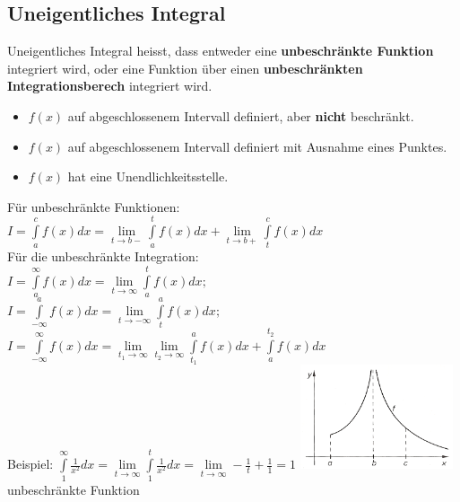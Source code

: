 	\renewcommand{\arraystretch}{1}
			



	\subsection{Uneigentliches Integral } %
	  Uneigentliches Integral heisst, dass entweder eine \textbf{unbeschränkte
	  Funktion} integriert wird, oder eine Funktion über einen
	  \textbf{unbeschränkten Integrationsberech} integriert wird.\\
	
		\begin{itemize}
			\setlength{\itemsep}{1pt}
			\setlength{\parskip}{0pt}
			\setlength{\parsep}{0pt}
			
		  	\item $f(x)$ auf abgeschlossenem Intervall definiert, aber \textbf{nicht}
		  	beschränkt.
			\item $f(x)$ auf abgeschlossenem Intervall definiert mit Ausnahme eines
			Punktes.
			\item $f(x)$ hat eine	 Unendlichkeitsstelle.
		\end{itemize}
	
	
	  \begin{multicols}{2}
	    F\"ur unbeschr\"ankte Funktionen:\\
	    $ I =\int\limits _{a}^{c}f(x)dx=\lim\limits_{t\to
	    b-}\int\limits_{a}^{t}f(x)dx+\lim\limits_{t\to b+}\int\limits_{t}^{c}f(x)dx
	    $ \\
	    F\"ur die unbeschr\"ankte Integration:\\
	    $ I =\int\limits _{a} ^{\infty} f(x)dx= \lim \limits_{t\to \infty}\int \limits
	    _{a} ^{t}f(x)dx; $ \\
	    $ I =\int\limits ^{a} _{-\infty} f(x)dx= \lim \limits_{t\to -\infty}\int
	    \limits _{t} ^{a}f(x)dx; $ \\
	    $I =\int\limits _{-\infty} ^{\infty} f(x)dx = \lim \limits_{t_1\to \infty} \lim
	    \limits
	    _{t_2 \to  \infty}\int \limits _{t_1} ^{a}f(x)dx +
	    \int\limits_{a}^{t_2}f(x)dx$\\
	    Beispiel: $\int\limits_{1}^{\infty}\frac{1}{x^2}dx=\lim\limits_{t\to
	    \infty}\int\limits_{1}^{t}\frac{1}{x^2}dx=\lim\limits_{t\to \infty}-\frac{1}{t}+\frac{1}{1}=1$
	    \includegraphics[width=4.5cm]{./bilder/unbeschraenkteFunktion.png}\\
	    unbeschr\"ankte Funktion
	  \end{multicols}
	  
